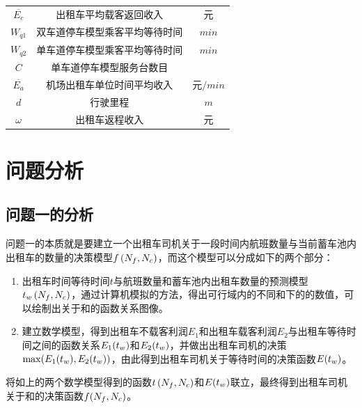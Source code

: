 \documentclass{cumcm}
\begin{document}
\begin{table}[H]
\begin{tabular*}{0.65\textwidth}{ccc}
		$\overline{E_c}$ & 出租车平均载客返回收入 & 元 \\
		$W_{q1}$ & 双车道停车模型乘客平均等待时间 & $min$ \\
		$W_{q2}$ & 单车道停车模型乘客平均等待时间 & $min$ \\  
		$C$ & 单车道停车模型服务台数目 & \\
		$\overline{E_a}$ & 机场出租车单位时间平均收入 & 元$/min$ \\
		$d$ & 行驶里程 & $m$ \\
		$\omega$ & 出租车返程收入 & 元 \\
		\bottomrule
	\end{tabular*}
\end{table}

\section{问题分析}
\subsection{问题一的分析}
问题一的本质就是要建立一个出租车司机关于一段时间内航班数量\flightnum 与当前蓄车池内出租车的数量\taxinum 的决策模型$f\left(\mbox{$N_f$},\mbox{$N_c$}\right)$，而这个模型可以分成如下的两个部分：
\begin{enumerate}[(1)]
	\item 出租车时间等待时间$t$与航班数量\flightnum 和蓄车池内出租车数量\taxinum 的预测模型$\mbox{$t_w$}\left(\mbox{$N_f$},\mbox{$N_c$}\right)$，通过计算机模拟的方法，得出可行域内的不同\flightnum 和\taxinum 下的\waittime 的数值，可以绘制出\waittime 关于\flightnum 和\taxinum 的函数关系图像。
	\item 建立数学模型，得到出租车不载客利润$E_1$和出租车载客利润$E_2$与出租车等待时间\waittime 之间的函数关系$E_1(\mbox{$t_w$})$和$E_2(\mbox{$t_w$})$，并做出出租车司机的决策$\max(E_1(\mbox{$t_w$}),E_2(\mbox{$t_w$}))$，由此得到出租车司机关于等待时间的决策函数$E(\mbox{$t_w$})$。
\end{enumerate}
\par
将如上的两个数学模型得到的函数$t\left(\mbox{$N_f$},\mbox{$N_c$}\right)$和$E(\mbox{$t_w$})$联立，最终得到出租车司机关于\flightnum 和\taxinum 的决策函数$f(\mbox{$N_f$},\mbox{$N_c$})$。
\end{document}
